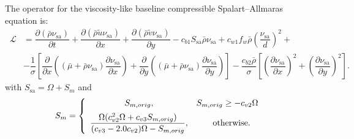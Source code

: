 \documentclass[10pt]{article}
\newcommand{\Diff}[2] {\dfrac{\partial( #1)}{\partial #2}}
\newcommand{\diff}[2] {\dfrac{\partial #1}{\partial #2}}
\newcommand{\Lo}{\,\mathcal{L}}
\newcommand{\sa}{\nu_{\mathrm{sa}}}
\newcommand{\tsa}{\mathrm{sa}}
\newcommand{\brho}{\bar{\rho}}
\newcommand{\tu}{\tilde{u}}
\newcommand{\tv}{\tilde{v}}
\newcommand{\bmu}{\bar{\mu}}
\begin{document}
The operator for the viscosity-like baseline compressible Spalart--Allmaras equation is:
\begin{equation*}
\begin{split}
\Lo&=  \Diff{\brho \sa }{t}+ \Diff{\brho \tu \sa }{x}+\Diff{\brho \tv \sa}{y}- c_{b1} S_\tsa \bar{\rho} \sa +c_{w1} f_w \brho \left(\dfrac{\sa}{d}\right)^2 +\\
   &- \dfrac{1 }{\sigma}\left[\diff{}{x}\left((\bmu+\bar{\rho} \sa) \diff{\sa}{x}\right)+\diff{}{y}\left((\bmu+\bar{\rho} \sa) \diff{\sa}{y}\right)\right] -\dfrac{c_{b2} \bar{\rho} }{\sigma} \left[ \left(\diff{\sa}{x}\right)^2 + \left(\diff{\sa}{y}\right)^2\right].
\end{split}
\end{equation*}
with $ S_{\mathrm{sa}} = \Omega + S_m$ and 
\begin{equation*}
S_m = \left\{ \begin{array}{cc}
S_{m, orig}, & S_{m,orig} \geq -c_{v2} \Omega \vspace{5pt}\\ 
\dfrac{\Omega (c_{v2}^2 \Omega + c_{v3} S_{m,orig})}{ (c_{v3}-2.0c_{v2}) \Omega - S_{m,orig}}, & \quad \mathrm{otherwise}.
\end{array}
\right.
\end{equation*}
\end{document}
